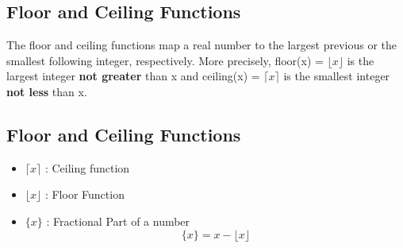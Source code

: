 \documentclass[a4paper,12pt]{article}
\begin{document}
\subsection{Floor and Ceiling Functions}
The floor and ceiling functions map a real number to the largest previous or the smallest following integer, respectively. More precisely, floor(x) = $\lfloor x\rfloor$ is the largest integer \textbf{not greater} than x and ceiling(x) =  $\lceil x \rceil$ is the smallest integer \textbf{not less} than x.



\subsection{Floor and Ceiling Functions}

{

\begin{itemize}
\item $\lceil x\rceil$ : Ceiling function
\item $\lfloor x\rfloor$  : Floor Function
\item $\{x\}$ : Fractional Part of a number
\[\{x\} = x- \lfloor x\rfloor \]
\end{itemize}
}
\end{document}
